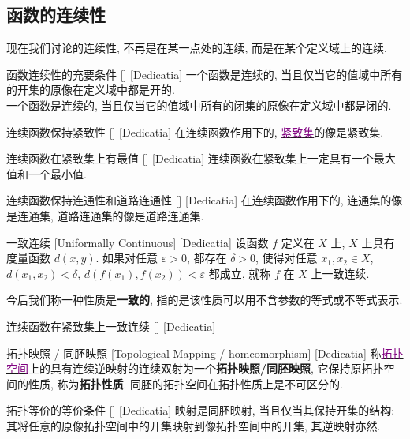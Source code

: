 \documentclass[UTF8]{ctexart}
\newcommand{\hyperrefc}[2]{\hyperref[#1]{\textcolor{purple}{#2}}}
\begin{document}
\subsection{函数的连续性}
现在我们讨论的连续性, 不再是在某一点处的连续, 而是在某个定义域上的连续. 
\begin{thm}
    [UUID]
    {函数连续性的充要条件}
    []
    [Dedicatia]
    一个函数是连续的, 当且仅当它的值域中所有的开集的原像在定义域中都是开的. \\
    一个函数是连续的, 当且仅当它的值域中所有的闭集的原像在定义域中都是闭的. 
\end{thm}
\begin{thm}
    [UUID]
    {连续函数保持紧致性}
    []
    [Dedicatia]
    在连续函数作用下的, \hyperrefc{dfn:Compactness}{紧致集}的像是紧致集. 
\end{thm}
\begin{crl}
    [UUID]
    {连续函数在紧致集上有最值}
    []
    [Dedicatia]
    连续函数在紧致集上一定具有一个最大值和一个最小值. 
\end{crl}
\begin{thm}
    [UUID]
    {连续函数保持连通性和道路连通性}
    []
    [Dedicatia]
    在连续函数作用下的, 连通集的像是连通集, 道路连通集的像是道路连通集.
\end{thm}
\begin{dfn}
    [UUID]
    {一致连续}
    [Uniformally Continuous]
    [Dedicatia]
    设函数 \( f \) 定义在 \( X \) 上,  \( X \) 上具有度量函数 \( d(x,y) \). 如果对任意 \( \varepsilon>0 \), 都存在 \( \delta>0 \), 使得对任意 \( x_1,x_2\in X \),  \( d(x_1,x_2)<\delta \),  \( d(f(x_1),f(x_2))<\varepsilon \) 都成立, 就称 \( f \) 在 \( X \) 上一致连续. 
\end{dfn}
今后我们称一种性质是\textbf{一致的}, 指的是该性质可以用不含参数的等式或不等式表示. 
\begin{thm}
    [UUID]
    {连续函数在紧致集上一致连续}
    []
    [Dedicatia]
\end{thm}
\begin{dfn}
    [UUID]
    {拓扑映照 / 同胚映照}
    [Topological Mapping / homeomorphism]
    [Dedicatia]
    称\hyperrefc{dfn:TopologicalSpace}{拓扑空间}上的具有连续逆映射的连续双射为一个\textbf{拓扑映照/同胚映照}, 它保持原拓扑空间的性质, 称为\textbf{拓扑性质}. 同胚的拓扑空间在拓扑性质上是不可区分的. 
\end{dfn}
\begin{crl}
    [UUID]
    {拓扑等价的等价条件}
    []
    [Dedicatia]
    映射是同胚映射, 当且仅当其保持开集的结构: 其将任意的原像拓扑空间中的开集映射到像拓扑空间中的开集, 其逆映射亦然. 
\end{crl}
\end{document}
